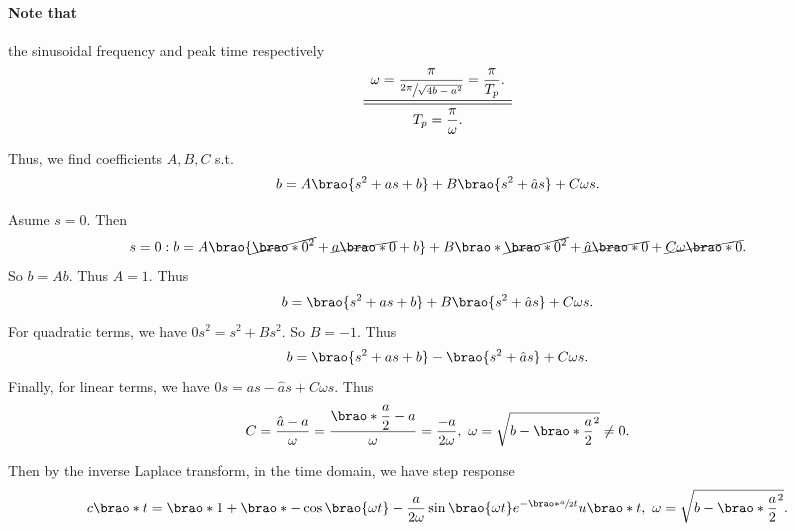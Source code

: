 \documentclass[12pt]{article}
\DeclarePairedDelimiter\brao()%
\begin{document}
\begin{enumerate}[(a)]
        \paragraph{Note that} the sinusoidal frequency and peak time respectively
        \begin{equation}\label{eq: w to-from Tp}
            \begin{array}{c}
            \displaystyle
                \omega = \frac\pi{\sfrac{2\pi}{\sqrt{4b - a^2}}} = \frac\pi{T_p}.
            \\*
            \midrule\midrule
            \displaystyle
                T_p = \frac\pi\omega.
            \\*
            \end{array}
        \end{equation}

        Thus, we find coefficients $A,B,C$ s.t.
        \begin{equation}
            b = A\brao{s^2 + as + b} + B\brao{s^2 + \hat{a}s} + C\omega s.
        \end{equation}

        Asume $s = 0$. Then
        \begin{equation}
            s = 0: b = A\brao{\cancel{\brao*0^2} + \cancel{a\brao*0} + b} + B\brao*{\cancel{\brao*0^2} + \cancel{\hat{a}\brao*0}} + \cancel{C\omega \brao*0}.
        \end{equation}
        So $b = Ab$. Thus $A = 1$. Thus
        \begin{equation}
            b = \brao{s^2 + as + b} + B\brao{s^2 + \hat{a}s} + C\omega s.
        \end{equation}
        For quadratic terms, we have $0s^2 = s^2 + Bs^2$. So $B = -1$. Thus
        \begin{equation}
            b = \brao{s^2 + as + b} - \brao{s^2 + \hat{a}s} + C\omega s.
        \end{equation}
        Finally, for linear terms, we have $0s = as - \hat{a}s + C\omega s$. Thus
        \begin{equation}
            C = \frac{\hat{a} - a}\omega
            = \frac{\displaystyle\brao*{\frac{a}2} - a}\omega
            = \frac{-a}{2\omega},\ 
            \omega = \sqrt{b - \brao*{\frac{a}2}^2} \not= 0.
        \end{equation}

        Then by the inverse Laplace transform, in the time domain, we have step response
        \begin{equation}
            \begin{aligned}
                c\brao*t = \brao*{1 + \brao*{-\cos\brao{\omega t} - \frac{a}{2\omega} \sin\brao{\omega t} }{e^{-\brao*{\sfrac{a}2}t}}}u\brao*t,\ 
                \omega = \sqrt{b - \brao*{\frac{a}2}^2}.
            \end{aligned}
        \end{equation}


\end{enumerate}
\end{document}
